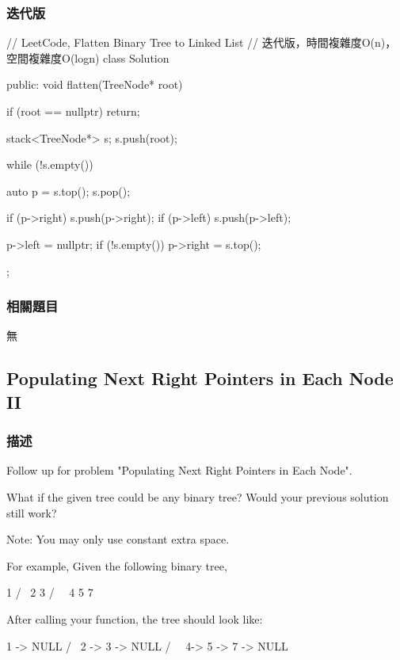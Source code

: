 \subsubsection{迭代版}
\begin{Code}
// LeetCode, Flatten Binary Tree to Linked List
// 迭代版，時間複雜度O(n)，空間複雜度O(logn)
class Solution {
public:
    void flatten(TreeNode* root) {
        if (root == nullptr) return;

        stack<TreeNode*> s;
        s.push(root);

        while (!s.empty()) {
            auto p = s.top();
            s.pop();

            if (p->right)
                s.push(p->right);
            if (p->left)
                s.push(p->left);

            p->left = nullptr;
            if (!s.empty())
                p->right = s.top();
        }
    }
};
\end{Code}


\subsubsection{相關題目}
\begindot
\item 無
\myenddot


\subsection{Populating Next Right Pointers in Each Node II} %
\label{sec:populating-next-right-pointers-in-each-node-ii}


\subsubsection{描述}
Follow up for problem "Populating Next Right Pointers in Each Node".

What if the given tree could be any binary tree? Would your previous solution still work?

Note: You may only use constant extra space.

For example,
Given the following binary tree,
\begin{Code}
         1
       /  \
      2    3
     / \    \
    4   5    7
\end{Code}

After calling your function, the tree should look like:
\begin{Code}
         1 -> NULL
       /  \
      2 -> 3 -> NULL
     / \    \
    4-> 5 -> 7 -> NULL
\end{Code}


